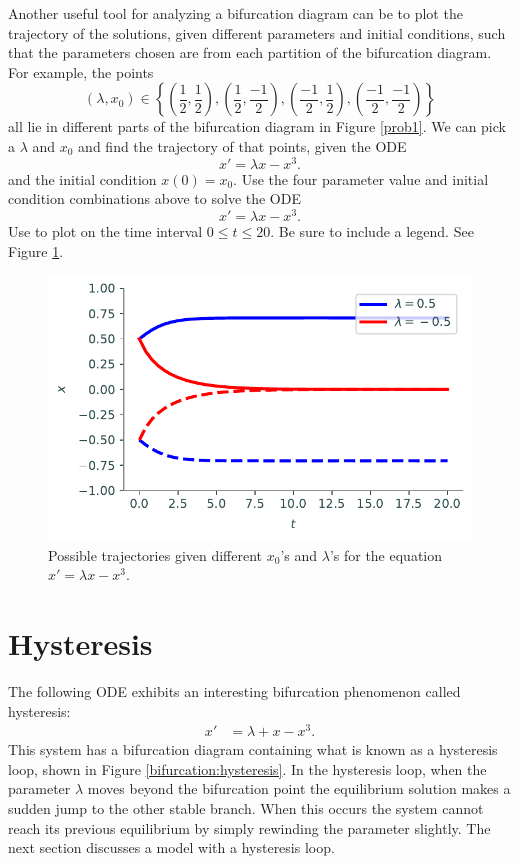 \begin{problem}
Another useful tool for analyzing a bifurcation diagram can be to plot the trajectory of the solutions, given different parameters and initial conditions, such that the parameters chosen are from each partition of the bifurcation diagram. For example, the points
\[(\lambda, x_0)\in \left\{\left(\frac{1}{2},\frac{1}{2}\right), \left(\frac{1}{2},\frac{-1}{2}\right), \left(\frac{-1}{2},\frac{1}{2}\right), \left(\frac{-1}{2},\frac{-1}{2}\right) \right\} \]
all lie in different parts of the bifurcation diagram in Figure \ref{prob1}. We can pick a $\lambda$ and $x_0$ and find the trajectory of that points, given the ODE
\[x' = \lambda x-x^3.\]
and the initial condition $x(0)=x_0$. 
Use the four parameter value and initial condition combinations above to solve the ODE 
\[x' = \lambda x-x^3.\]
Use  to plot on the time interval $0\leq t \leq 20$.
Be sure to include a legend.
See Figure \ref{fig:hysteresis:pitchfork_state_space}.
\end{problem}

\begin{figure}[H]
\centering
\includegraphics[width=\textwidth]{figures/pitchfork_state_space.pdf}
\caption{Possible trajectories given different $x_0$'s and $\lambda$'s for the equation $x' = \lambda x - x^3$.}
\label{fig:hysteresis:pitchfork_state_space}
\end{figure}

\section*{Hysteresis}

The following ODE exhibits an interesting bifurcation phenomenon called hysteresis:
\begin{align*}
	x' &= \lambda + x - x^3.
\end{align*}
This system has a bifurcation diagram containing what is known as a hysteresis loop, shown in Figure \ref{bifurcation:hysteresis}.
In the hysteresis loop, when the parameter $\lambda$ moves beyond the bifurcation point the equilibrium solution makes a sudden jump to the other stable branch.
When this occurs the system cannot reach its previous equilibrium by simply rewinding the parameter slightly. The next section discusses a model with a hysteresis loop.

